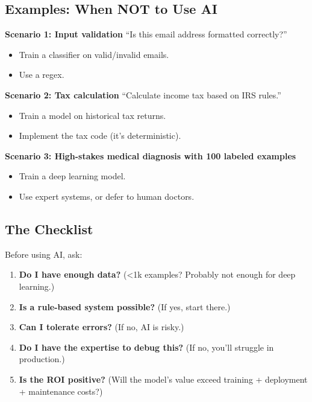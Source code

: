 \documentclass[11pt,oneside]{book}
\begin{document}
\subsection{Examples: When NOT to Use AI}

\textbf{Scenario 1: Input validation}
``Is this email address formatted correctly?''

\begin{itemize}
\item[\texttimes] Train a classifier on valid/invalid emails.
\item[\checkmark] Use a regex.
\end{itemize}

\textbf{Scenario 2: Tax calculation}
``Calculate income tax based on IRS rules.''

\begin{itemize}
\item[\texttimes] Train a model on historical tax returns.
\item[\checkmark] Implement the tax code (it's deterministic).
\end{itemize}

\textbf{Scenario 3: High-stakes medical diagnosis with 100 labeled examples}
\begin{itemize}
\item[\texttimes] Train a deep learning model.
\item[\checkmark] Use expert systems, or defer to human doctors.
\end{itemize}

\subsection{The Checklist}

Before using AI, ask:

\begin{enumerate}
\item \textbf{Do I have enough data?} (<1k examples? Probably not enough for deep learning.)
\item \textbf{Is a rule-based system possible?} (If yes, start there.)
\item \textbf{Can I tolerate errors?} (If no, AI is risky.)
\item \textbf{Do I have the expertise to debug this?} (If no, you'll struggle in production.)
\item \textbf{Is the ROI positive?} (Will the model's value exceed training + deployment + maintenance costs?)
\end{enumerate}
\end{document}

